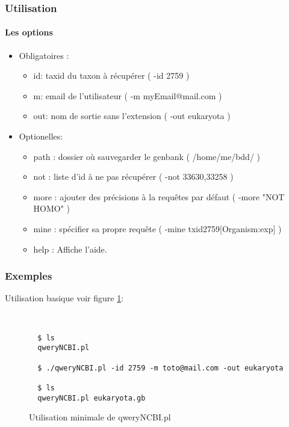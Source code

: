 \subsubsection{Utilisation}
\paragraph{Les options}
\begin{itemize}
 \item Obligatoires :
\begin{itemize}
 
     \item id: taxid du taxon à récupérer ( -id 2759 )
     \item m: email de l'utilisateur ( -m myEmail@mail.com )
    \item out: nom de sortie sans l'extension ( -out eukaryota )
  \end{itemize}
  \item Optionelles:
  \begin{itemize}
    \item path : dossier où sauvegarder le genbank ( /home/me/bdd/ )
    \item not : liste d'id à ne pas récupérer ( -not 33630,33258 )
    \item more : ajouter des précisions à la requêtes par défaut ( -more "NOT HOMO" )
    \item mine : spécifier sa propre requête ( -mine txid2759[Organism:exp] )
    \item help : Affiche l'aide.
  \end{itemize}
\end{itemize}


\subsubsection{Exemples}

Utilisation basique voir figure \ref{ub}:

~\\
\begin{figure}[H]

\begin{center}
\begin{verbatim}
  $ ls 
  qweryNCBI.pl
  
  $ ./qweryNCBI.pl -id 2759 -m toto@mail.com -out eukaryota
  
  $ ls
  qweryNCBI.pl eukaryota.gb
  \end{verbatim}
\end{center}
\caption{\label{ub}Utilisation minimale de qweryNCBI.pl}
\end{figure}
~\\

